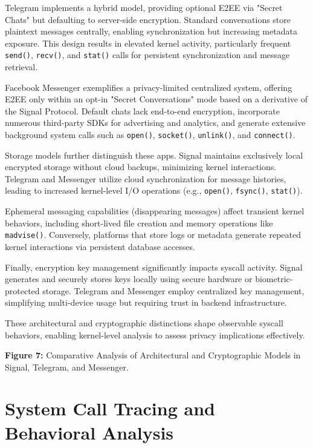 \documentclass[a4paper,12pt]{report}
\begin{document}
Telegram implements a hybrid model, providing optional E2EE via "Secret Chats" but defaulting to server-side encryption. Standard conversations store plaintext messages centrally, enabling synchronization but increasing metadata exposure. This design results in elevated kernel activity, particularly frequent \texttt{send()}, \texttt{recv()}, and \texttt{stat()} calls for persistent synchronization and message retrieval.

Facebook Messenger exemplifies a privacy-limited centralized system, offering E2EE only within an opt-in "Secret Conversations" mode based on a derivative of the Signal Protocol. Default chats lack end-to-end encryption, incorporate numerous third-party SDKs for advertising and analytics, and generate extensive background system calls such as \texttt{open()}, \texttt{socket()}, \texttt{unlink()}, and \texttt{connect()}.

Storage models further distinguish these apps. Signal maintains exclusively local encrypted storage without cloud backups, minimizing kernel interactions. Telegram and Messenger utilize cloud synchronization for message histories, leading to increased kernel-level I/O operations (e.g., \texttt{open()}, \texttt{fsync()}, \texttt{stat()}).

Ephemeral messaging capabilities (disappearing messages) affect transient kernel behaviors, including short-lived file creation and memory operations like \texttt{madvise()}. Conversely, platforms that store logs or metadata generate repeated kernel interactions via persistent database accesses.

Finally, encryption key management significantly impacts syscall activity. Signal generates and securely stores keys locally using secure hardware or biometric-protected storage. Telegram and Messenger employ centralized key management, simplifying multi-device usage but requiring trust in backend infrastructure.

These architectural and cryptographic distinctions shape observable syscall behaviors, enabling kernel-level analysis to assess privacy implications effectively.

\textbf{Figure 7:} Comparative Analysis of Architectural and Cryptographic Models in Signal, Telegram, and Messenger.

\section{System Call Tracing and Behavioral Analysis}
\end{document}
